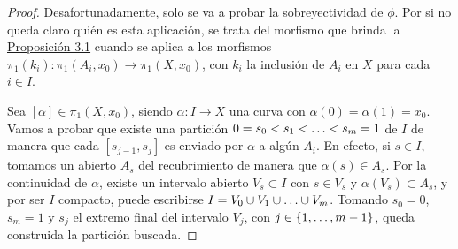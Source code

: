 \documentclass[11pt]{report}
\theoremstyle{definition}
\theoremstyle{definition}
\theoremstyle{remark}
\begin{document}
\begin{proof}
Desafortunadamente, solo se va a probar la sobreyectividad de $\phi$. Por si no queda claro quién es esta aplicación, se trata del morfismo que brinda la \hyperref[prop3.1.]{\color{blue}Proposición 3.1} cuando se aplica a los morfismos $\pi_1(k_i) \colon \pi_1(A_i,x_0) \to \pi_1(X,x_0)$, con $k_i$ la inclusión de $A_i$ en $X$ para cada $i \in I$.

\vspace{2mm}

Sea $[\alpha] \in \pi_1(X,x_0)$, siendo $\alpha \colon I \to X$ una curva con $\alpha(0)=\alpha(1)=x_0$. Vamos a probar que existe una partición $0=s_0 < s_1 < \mathellipsis < s_m = 1$ de $I$ de manera que cada $[s_{j-1},s_{j}]$ es enviado por $\alpha$ a algún $A_i$. En efecto, si $s \in I$, tomamos un abierto $A_s$ del recubrimiento de manera que $\alpha(s) \in A_s$. Por la continuidad de $\alpha$, existe un intervalo abierto $V_s \subset I$ con $s \in V_s$ y $\alpha(V_s) \subset A_s$, y por ser $I$ compacto, puede escribirse $I = V_{0} \cup V_{1} \cup \mathellipsis \cup V_{m}$. Tomando $s_0 = 0$, $s_m = 1$ y $s_j$ el extremo final del intervalo $V_j$, con $j \in \{1,\mathellipsis,m-1\}$, queda construida la partición buscada.

\vspace{2mm}


\end{proof}
\end{document}
